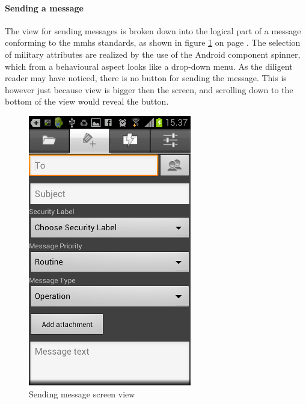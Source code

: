 \newpage

\paragraph{Sending a message}\hfill 
\newline
The view for sending messages is broken down into the logical part of a message conforming to the \gls{mmhs} standards, as shown in figure \ref{fig:frontend_messagesend} on page \pageref{fig:frontend_messagesend}.
The selection of military attributes are realized by the use of the Android component spinner, which from a behavioural aspect looks like a drop-down menu.
As the diligent reader may have noticed, there is no button for sending the message. This is however just because view is bigger then the screen, and scrolling down to the bottom of the view would reveal the button. 

\begin{figure}[h!]
\begin{center}
\includegraphics{sendmessage_final}
\end{center}
\caption{Sending message screen view} \label{fig:frontend_messagesend}
\end{figure}

